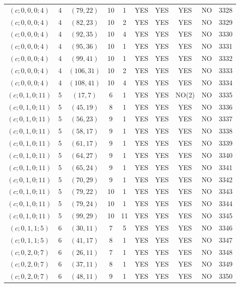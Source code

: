 \begin{longtable}{|c|c|c|c|c|c|c|c|c|c|}
$(c; 0, 0, 0; 4)$ & 4 & $(79, 22)$ & 10 & 1 & YES & YES & YES & NO & 3328\\
$(c; 0, 0, 0; 4)$ & 4 & $(82, 23)$ & 10 & 2 & YES & YES & YES & NO & 3329\\
$(c; 0, 0, 0; 4)$ & 4 & $(92, 35)$ & 10 & 4 & YES & YES & YES & NO & 3330\\
$(c; 0, 0, 0; 4)$ & 4 & $(95, 36)$ & 10 & 1 & YES & YES & YES & NO & 3331\\
$(c; 0, 0, 0; 4)$ & 4 & $(99, 41)$ & 10 & 1 & YES & YES & YES & NO & 3332\\
$(c; 0, 0, 0; 4)$ & 4 & $(106, 31)$ & 10 & 2 & YES & YES & YES & NO & 3333\\
$(c; 0, 0, 0; 4)$ & 4 & $(108, 41)$ & 10 & 4 & YES & YES & YES & NO & 3334\\
$(c; 0, 1, 0; 11)$ & 5 & $(17, 7)$ & 6 & 1 & YES & YES & NO(2) & NO & 3335\\
$(c; 0, 1, 0; 11)$ & 5 & $(45, 19)$ & 8 & 1 & YES & YES & YES & NO & 3336\\
$(c; 0, 1, 0; 11)$ & 5 & $(56, 23)$ & 9 & 1 & YES & YES & YES & NO & 3337\\
$(c; 0, 1, 0; 11)$ & 5 & $(58, 17)$ & 9 & 1 & YES & YES & YES & NO & 3338\\
$(c; 0, 1, 0; 11)$ & 5 & $(61, 17)$ & 9 & 1 & YES & YES & YES & NO & 3339\\
$(c; 0, 1, 0; 11)$ & 5 & $(64, 27)$ & 9 & 1 & YES & YES & YES & NO & 3340\\
$(c; 0, 1, 0; 11)$ & 5 & $(65, 24)$ & 9 & 1 & YES & YES & YES & NO & 3341\\
$(c; 0, 1, 0; 11)$ & 5 & $(70, 29)$ & 9 & 1 & YES & YES & YES & NO & 3342\\
$(c; 0, 1, 0; 11)$ & 5 & $(79, 22)$ & 10 & 1 & YES & YES & YES & NO & 3343\\
$(c; 0, 1, 0; 11)$ & 5 & $(79, 24)$ & 10 & 1 & YES & YES & YES & NO & 3344\\
$(c; 0, 1, 0; 11)$ & 5 & $(99, 29)$ & 10 & 11 & YES & YES & YES & NO & 3345\\
$(c; 0, 1, 1; 5)$ & 6 & $(30, 11)$ & 7 & 5 & YES & YES & YES & NO & 3346\\
$(c; 0, 1, 1; 5)$ & 6 & $(41, 17)$ & 8 & 1 & YES & YES & YES & NO & 3347\\
$(c; 0, 2, 0; 7)$ & 6 & $(26, 11)$ & 7 & 1 & YES & YES & YES & NO & 3348\\
$(c; 0, 2, 0; 7)$ & 6 & $(37, 11)$ & 8 & 1 & YES & YES & YES & NO & 3349\\
$(c; 0, 2, 0; 7)$ & 6 & $(48, 11)$ & 9 & 1 & YES & YES & YES & NO & 3350\\

\end{longtable}
